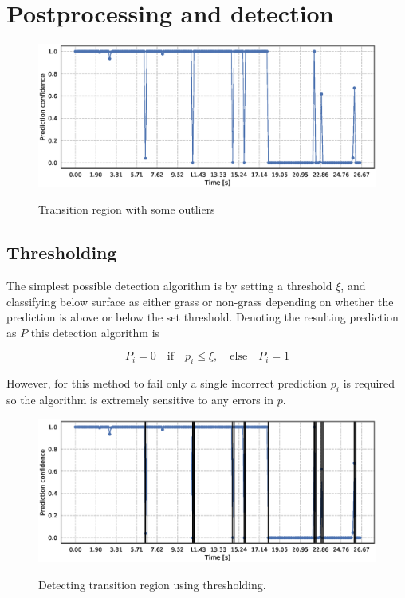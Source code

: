 \section{Postprocessing and detection}


\begin{figure}
	\includegraphics[scale=0.5]{figs_temp/detect_nothing}
	\label{fig:detect_no}
	\caption{Transition region with some outliers}
\end{figure}

\subsection{Thresholding}

The simplest possible detection algorithm is by setting a threshold $\xi$, and classifying below surface as either grass or non-grass depending on whether the prediction is above or below the set threshold. Denoting the resulting prediction as $P$ this detection algorithm is 

\begin{equation}
	P_i=0 \quad\text{if}\quad p_i\leq\xi, \quad
	\text{else} \quad P_i=1
\end{equation}

However, for this method to fail only a single incorrect prediction $p_i$ is required so the algorithm is extremely sensitive to any errors in $p$.

\begin{figure}
	\includegraphics[scale=0.5]{figs_temp/detect_thresh}
	\label{fig:detect_thresh}
	\caption{Detecting transition region using thresholding.}
\end{figure}

